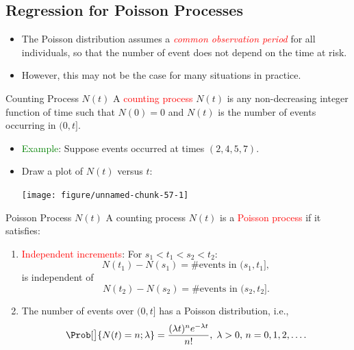 \documentclass{article}\usepackage[]{graphicx}\usepackage[svgnames]{xcolor}
\newenvironment{knitrout}{}{} %
\begin{document}
\subsection*{Regression for Poisson Processes}
\begin{itemize}
      \item The Poisson distribution assumes a \textcolor{Red}{\emph{common observation period}} for all individuals,
            so that the number of event does not depend on the time at risk.
      \item However, this may not be the case for many situations in practice.
\end{itemize}
\begin{Regular}{Counting Process $ N(t) $}
      A \textcolor{Red}{counting process} $ N(t) $ is any non-decreasing integer function of time such that
      $ N(0)=0 $ and $ N(t) $ is the number of events occurring in $ (0,t] $.
\end{Regular}
\begin{itemize}
      \item \textcolor{Green}{Example}: Suppose events occurred at times $ (2,4,5,7) $.
      \item Draw a plot of $ N(t) $ versus $ t $:
\begin{knitrout}
\color{fgcolor}

{\centering \texttt{[image: figure/unnamed-chunk-57-1]} 

}


\end{knitrout}
\end{itemize}
\begin{Regular}{Poisson Process $ N(t) $}
      A counting process $ N(t) $ is a \textcolor{Red}{Poisson process} if it satisfies:
      \begin{enumerate}[1.]
            \item \textcolor{Red}{Independent increments}: For $ s_1<t_1<s_2<t_2 $:
                  \[ N(t_1)-N(s_1)=\text{\# events in $(s_1,t_1]$}, \]
                  is independent of
                  \[ N(t_2)-N(s_2)=\text{\# events in $(s_2,t_2]$}. \]
            \item The number of events over $ (0,t] $ has a Poisson distribution, i.e.,
                  \[ \Prob[\big]{N(t)=n;\lambda}=\frac{(\lambda t)^n e^{-\lambda t}}{n!},\; \lambda>0,\, n=0,1,2,\ldots.  \]
      \end{enumerate}
\end{Regular}
\end{document}
